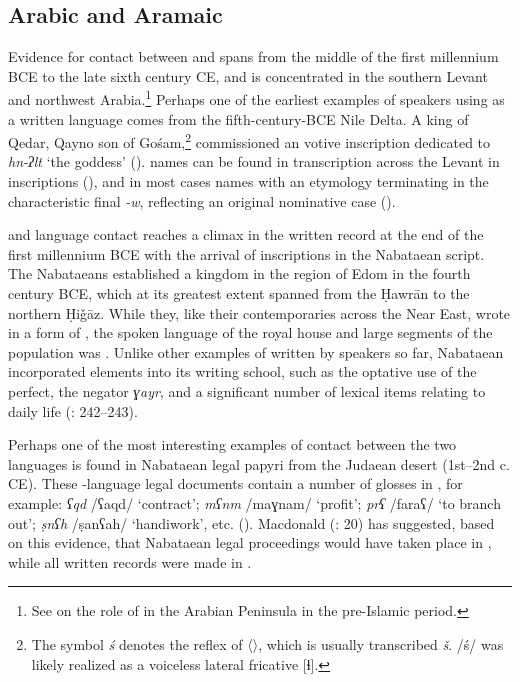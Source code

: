 \documentclass[output=paper]{langsci/langscibook}
\begin{document}
\subsection{Arabic and Aramaic}
Evidence for contact between  and  spans from the middle of the first millennium BCE to the late sixth century CE, and is concentrated in the southern Levant and northwest Arabia.\footnote{See \citet{Stein2018} on the role of  in the Arabian Peninsula in the pre-Islamic period.} Perhaps one of the earliest examples of  speakers using  as a written language comes from the fifth-century-BCE Nile Delta. A king of Qedar, Qayno  son of Gośam,\footnote{The symbol \textit{ś} denotes the   reflex of   〈〉, which is usually transcribed \textit{š}. /ś/ was likely realized as a voiceless lateral fricative [ɬ].} commissioned an  votive inscription dedicated to \textit{hn-ʔlt} ‘the goddess’ (\citealt{Rabinowitz1956}).  names can be found in transcription across the Levant in  inscriptions (\citealt{Israel1995}), and in most cases names with an  etymology terminating in the characteristic final \textit{-w}, reflecting an original nominative case (\citealt{Al-Jalladforthcoming}). 

 and  language contact reaches a climax in the written record at the end of the first millennium BCE with the arrival of inscriptions in the Nabataean script. The Nabataeans established a kingdom in the region of Edom in the fourth century BCE, which at its greatest extent spanned from the Ḥawrān to the northern Ḥiǧāz. While they, like their contemporaries across the Near East, wrote in a form of  , the spoken language of the royal house and large segments of the population was . Unlike other examples of  written by  speakers so far, Nabataean incorporated  elements into its writing school, such as the optative use of the perfect, the negator \textit{ɣayr}, and a significant number of lexical items relating to daily life (\citealt{Gzella2015}: 242--243).

Perhaps one of the most interesting examples of contact between the two languages is found in Nabataean legal papyri from the Judaean desert (1st--2nd c. CE). These -language legal documents contain a number of glosses in , for example: \textit{ʕqd} /ʕaqd/ ‘contract’; \textit{mʕnm} /maɣnam/ ‘profit’; \textit{prʕ} /faraʕ/ ‘to branch out’; \textit{ṣnʕh} /ṣanʕah/ ‘handiwork’, etc. (\citealt{Yardeni2014}). Macdonald (\citeyear{Macdonald2010}: 20) has suggested, based on this evidence, that {Nabataean} legal proceedings would have taken place in , while all written records were made in .
\end{document}
